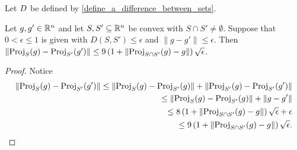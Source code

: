 \begin{corollary}
Let ${D}$ be defined by \cref{define_a_difference_between_sets}.

Let $g, g' \in \mathbb R^n$ and let $S, S' \subseteq \mathbb R^n$ be convex with $S \cap S' \ne \emptyset$.
Suppose that $0 < \epsilon \le 1$ is given with $D\left(S, S'\right) \le \epsilon$ and $\|g - g'\| \le \epsilon$.
Then $\|{\textrm{Proj}}_S(g) - {\textrm{Proj}}_{S'}(g')\| \le 9\left(1 + \|{\textrm{Proj}}_{S \cap S'}(g) - g\|\right) \sqrt{\epsilon}$.
\end{corollary}
\begin{proof}
Notice
\begin{align*}
\|{\textrm{Proj}}_S(g) - {\textrm{Proj}}_{S'}(g')\| 
\le \|{\textrm{Proj}}_S(g) - {\textrm{Proj}}_{S'}(g)\| + \|{\textrm{Proj}}_{S'}(g) - {\textrm{Proj}}_{S'}(g')\| \\
\le \|{\textrm{Proj}}_S(g) - {\textrm{Proj}}_{S'}(g)\| + \|g - g'\| \\
\le 8\left(1 + \|{\textrm{Proj}}_{S \cap S'}(g) - g\|\right) \sqrt{\epsilon} + \epsilon \\
\le 9\left(1 + \|{\textrm{Proj}}_{S \cap S'}(g) - g\|\right) \sqrt{\epsilon}.
\end{align*}
\end{proof}

